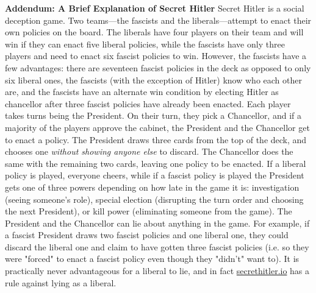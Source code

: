 \documentclass[]{article}
\begin{document}
\newpage
\noindent
\textbf{Addendum: A Brief Explanation of Secret Hitler}
\newline\indent
Secret Hitler is a social deception game. Two teams—the fascists and the liberals—attempt to enact their own policies on the board. The liberals have four players on their team and will win if they can enact five liberal policies, while the fascists have only three players and need to enact six fascist policies to win. However, the fascists have a few advantages: there are seventeen fascist policies in the deck as opposed to only six liberal ones, the fascists (with the exception of Hitler) know who each other are, and the fascists have an alternate win condition by electing Hitler as chancellor after three fascist policies have already been enacted.
\newline\indent
Each player takes turns being the President. On their turn, they pick a Chancellor, and if a majority of the players approve the cabinet, the President and the Chancellor get to enact a policy. The President draws three cards from the top of the deck, and chooses one \emph{without showing anyone else} to discard. The Chancellor does the same with the remaining two cards, leaving one policy to be enacted. If a liberal policy is played, everyone cheers, while if a fascist policy is played the President gets one of three powers depending on how late in the game it is: investigation (seeing someone's role), special election (disrupting the turn order and choosing the next President), or kill power (eliminating someone from the game).
\newline\indent
The President and the Chancellor can lie about anything in the game. For example, if a fascist President draws two fascist policies and one liberal one, they could discard the liberal one and claim to have gotten three fascist policies (i.e. so they were "forced" to enact a fascist policy even though they "didn't" want to). It is practically never advantageous for a liberal to lie, and in fact \href{secrethitler.io}{secrethitler.io} has a rule against lying as a liberal.
\vspace{0.5cm}
\newline
\end{document}
